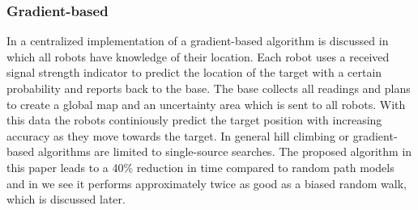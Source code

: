 	\subsubsection{Gradient-based}
		In \cite{zhang2009gradient} a centralized implementation of a gradient-based algorithm is discussed in which all robots have knowledge of their location.
		Each robot uses a received signal strength indicator to predict the location of the target with a certain probability and reports back to the base.
		The base collects all readings and plans to create a global map and an uncertainty area which is sent to all robots.
		With this data the robots continiously predict the target position with increasing accuracy as they move towards the target.
		In general hill climbing or gradient-based algorithms are limited to single-source searches.
		The proposed algorithm in this paper leads to a 40\% reduction in time compared to random path models and in \cite{dhariwal2004bacterium} we see it performs approximately twice as good as a biased random walk, which is discussed later.

